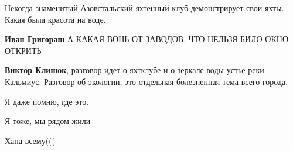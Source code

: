  
 
 
 
 

\qqSecCmt


Некогда знаменитый Азовстальский яхтенный клуб демонстрирует свои яхты. Какая
была красота на воде.

\begin{itemize} %
\textbf{Иван Григораш} А КАКАЯ ВОНЬ ОТ ЗАВОДОВ. ЧТО НЕЛЬЗЯ БИЛО ОКНО ОТКРИТЬ

\textbf{Виктор Клинюк}, разговор идет о яхтклубе и о зеркале воды устье реки Кальмиус. Разговор об экологии, это отдельная болезненная тема всего города.
\end{itemize} %


Я даже помню, где это.


Я тоже, мы рядом жили


Хана всему(((
